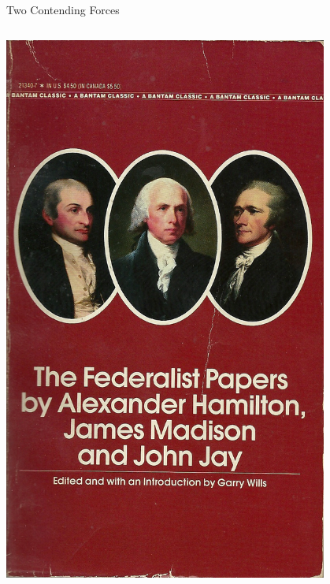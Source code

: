 \begin{frame}{Two Contending Forces}
    \begin{columns}[onlytextwidth]
            \centering
            \includegraphics[width=0.8\textwidth]{img/federalistpapers.jpg} \\


\end{columns}
\end{frame}
